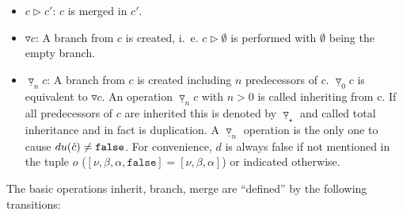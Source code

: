 \documentclass[fleqn, 10pt, a4paper]{article}
\begin{document}
\begin{itemize}
\item $c \rhd c'$: $c$ is merged in $c'$.
\item $\triangledown c$: A branch from $c$ is created, i.~e. $c \rhd \emptyset$
is performed with $\emptyset$ being the empty branch.
\item $\underline\triangledown_n c$: A branch from $c$ is created including $n$
predecessors of $c$. $\underline\triangledown_0 c$ is equivalent to
$\triangledown c$.
An operation $\underline\triangledown_n c$ with $n>0$ is called inheriting from c.
If all predecessors of $c$ are inherited this is denoted
by $\underline\triangledown_\star$
and called total inheritance and in fact is duplication. A
$\underline\triangledown_n$ operation is the only one to cause
$\mathnormal{du}(\hat c)\neq \mathtt{false}$. For convenience,
$d$ is always false if not mentioned in the tuple $o$ ($[\nu, \beta, \alpha,
\mathtt{false}]=[\nu, \beta, \alpha]$)
or indicated otherwise.
\end{itemize}

The basic operations inherit, branch, merge are ``defined'' by the
following transitions:	
\end{document}
